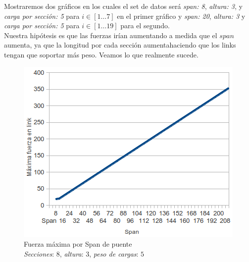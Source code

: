 Mostraremos dos gráficos en los cuales el set de datos será \textit{span: 8},
\textit{altura: 3}, y \textit{carga por sección: 5} para $i \in [1 \dots 7]$ en el primer gráfico y 
\textit{span: 20}, \textit{altura: 3} y \textit{carga por sección: 5} para $i \in [1 \dots 19]$ para el segundo.\\

Nuestra hipótesis es que las fuerzas irían aumentando a medida que el $span$ 
aumenta, ya que la longitud por cada sección aumentahaciendo que los links tengan que soportar más peso. Veamos lo que realmente sucede.\\



\begin{figure}[h!]
	\begin{center}
	\includegraphics[scale=0.8]{archivos/graficos/Fuerza-x-span.png}
	\caption{\label{fig:fuerza_x_span}Fuerza máxima por Span de puente\\  \textit{Secciones}: $8$, \textit{altura}: $3$, \textit{peso de cargas}: $5$}
	\end{center}
\end{figure}

